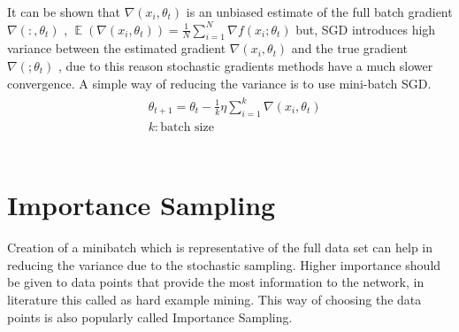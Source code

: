 \documentclass[a4paper,twoside]{iiththesis}
\theoremstyle{definition}
\theoremstyle{definition}
\theoremstyle{remark}
\DeclareMathOperator*{\E}{\mathop{\mathbb{E}}}
\begin{document}
It can be shown that $\nabla(x_i, \theta_t)$ is an unbiased estimate of the full batch gradient $\nabla (:, \theta_t)$ , $\E (\nabla( x_i, \theta_t)) = \frac{1}{N}\sum_{i=1}^N \nabla f(x_i; \theta_t)$ but, SGD introduces high variance between the estimated gradient $\nabla(x_i, \theta_t)$ and the true gradient $\nabla(; \theta_t)$ , due to this reason stochastic gradients methods have a much slower convergence.  A simple way of reducing the variance is to use mini-batch SGD. 
\begin{align}
\begin{split}
    &\theta_{t+1}=\theta_{t} -  \frac{1}{k}\eta  \sum_{i=1}^k \nabla (x_i, \theta_t) \\
    & k: \text{batch size}
   \end{split}
\end{align}
\\ 
\section{Importance Sampling}
Creation of a minibatch which is representative of the full data set can help in reducing the variance due to the stochastic sampling. Higher importance should be given to data points that provide the most information to the network, in literature this called as hard example mining\cite{shrivastava2016training}.  This way of choosing the data points is also popularly called Importance Sampling.  %
% 
% 
\end{document}
